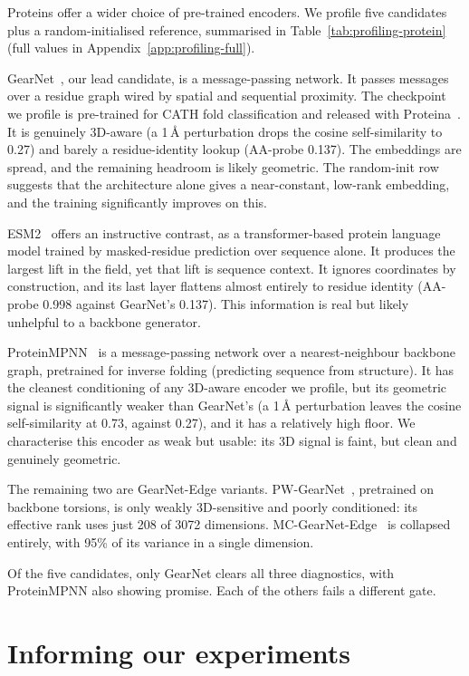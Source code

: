 \documentclass[12pt,a4paper,twoside]{report}
\begin{document}
Proteins offer a wider choice of pre-trained encoders. We profile five candidates plus a random-initialised reference, summarised in Table~\ref{tab:profiling-protein} (full values in Appendix~\ref{app:profiling-full}).

GearNet~\cite{GearNet}, our lead candidate, is a message-passing network. It passes messages over a residue graph wired by spatial and sequential proximity. The checkpoint we profile is pre-trained for CATH fold classification and released with Proteina~\cite{Proteina}. It is genuinely 3D-aware (a 1\,\AA{} perturbation drops the cosine self-similarity to 0.27) and barely a residue-identity lookup (AA-probe 0.137). The embeddings are spread, and the remaining headroom is likely geometric. The random-init row suggests that the architecture alone gives a near-constant, low-rank embedding, and the training significantly improves on this.

ESM2~\cite{ESM2} offers an instructive contrast, as a transformer-based protein language model trained by masked-residue prediction over sequence alone. It produces the largest lift in the field, yet that lift is sequence context. It ignores coordinates by construction, and its last layer flattens almost entirely to residue identity (AA-probe 0.998 against GearNet's 0.137). This information is real but likely unhelpful to a backbone generator.

ProteinMPNN~\cite{ProteinMPNN} is a message-passing network over a nearest-neighbour backbone graph, pretrained for inverse folding (predicting sequence from structure). It has the cleanest conditioning of any 3D-aware encoder we profile, but its geometric signal is significantly weaker than GearNet's (a 1\,\AA{} perturbation leaves the cosine self-similarity at 0.73, against 0.27), and it has a relatively high floor. We characterise this encoder as weak but usable: its 3D signal is faint, but clean and genuinely geometric.

The remaining two are GearNet-Edge variants. PW-GearNet~\cite{GearNet,ProteinWorkshop}, pretrained on backbone torsions, is only weakly 3D-sensitive and poorly conditioned: its effective rank uses just 208 of 3072 dimensions. MC-GearNet-Edge~\cite{GearNet} is collapsed entirely, with 95\% of its variance in a single dimension.

Of the five candidates, only GearNet clears all three diagnostics, with ProteinMPNN also showing promise. Each of the others fails a different gate.

\section{Informing our experiments}
\label{sec:profiling-predictions}
\end{document}
